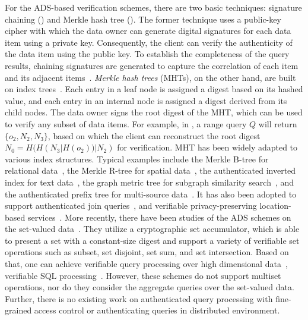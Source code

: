 For the ADS-based verification schemes, there are two basic techniques: signature chaining () and Merkle hash tree (). The former technique uses a public-key cipher with which the data owner can generate digital signatures for each data item using a private key. Consequently, the client can verify the authenticity of the data item using the public key. To establish the completeness of the query results, chaining signatures are generated to capture the correlation of each item and its adjacent items~\cite{10.1109/ICDE.2004.1320027}. \emph{Merkle hash trees} (MHTs), on the other hand, are built on index trees~\cite{10.1007/0-387-34805-0_21}. Each entry in a leaf node is assigned a digest based on its hashed value, and each entry in an internal node is assigned a digest derived from its child nodes. The data owner signs the root digest of the MHT, which can be used to verify any subset of data items. For example, in , a range query $Q$ will return $\{o_2, N_2, N_3\}$, based on which the client can reconstruct the root digest $N_0 = H( H(N_3 | H(o_2))| N_2)$ for verification. MHT has been widely adapted to various index structures. Typical examples include the Merkle B-tree for relational data~\cite{10.1145/1142473.1142488}, the Merkle R-tree for spatial data~\cite{10.1007/s00778-008-0113-2,10.1109/icde.2011.5767829}, the authenticated inverted index for text data~\cite{10.14778/1453856.1453875}, the graph metric tree for subgraph similarity search~\cite{10.1109/tkde.2014.2316818}, and the authenticated prefix tree for multi-source data~\cite{10.1145/2723372.2747649}. It has also been adopted to support authenticated join queries~\cite{10.1145/1559845.1559849}, and verifiable privacy-preserving location-based services~\cite{10.1145/2213836.2213871,10.1109/icde.2013.6544932,10.14778/2732219.2732224}. More recently, there have been studies of the ADS schemes on the set-valued data~\cite{10.1007/978-3-642-22792-9_6,10.1007/978-3-642-54631-0_7,10.1109/eurosp.2017.35}. They utilize a cryptographic set accumulator, which is able to present a set with a constant-size digest and support a variety of verifiable set operations such as subset, set disjoint, set sum, and set intersection. Based on that, one can achieve verifiable query processing over high dimensional data~\cite{10.1145/2660267.2660373}, verifiable SQL processing~\cite{10.1145/2810103.2813711}. However, these schemes do not support multiset operations, nor do they consider the aggregate queries over the set-valued data. Further, there is no existing work on authenticated query processing with fine-grained access control or authenticating queries in distributed environment.

